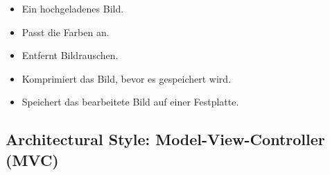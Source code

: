 \begin{infoBox}[title=Beispielanwendung]
    \begin{itemize}
        \item {} Ein hochgeladenes Bild.
        \item {} Passt die Farben an.
        \item {} Entfernt Bildrauschen.
        \item {} Komprimiert das Bild, bevor es gespeichert wird.
        \item {} Speichert das bearbeitete Bild auf einer Festplatte.
    \end{itemize}
\end{infoBox}
\subsection{Architectural Style: Model-View-Controller (MVC)}
